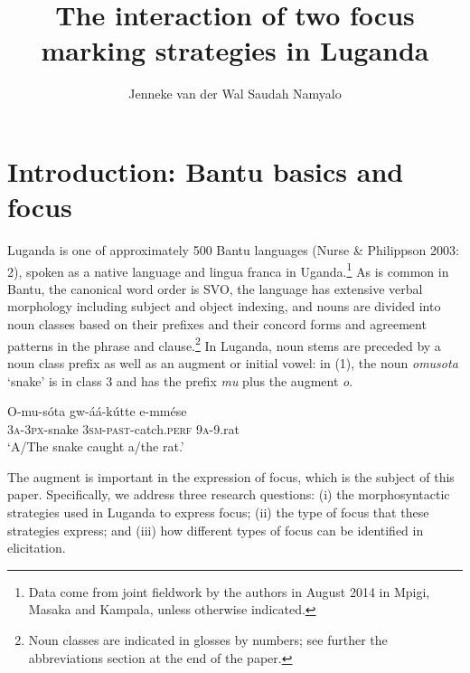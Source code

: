 \documentclass[output=paper]{langsci/langscibook}
\title{The interaction of two focus marking strategies in Luganda}
\author{%
Jenneke van der Wal \affiliation{University of Cambridge}\lastand 
 Saudah Namyalo \affiliation{Makerere University}
}
\begin{document}
 
 




\section{Introduction: Bantu basics and focus} 

Luganda is one of approximately 500 Bantu languages (Nurse \& Philippson 2003: 2), spoken as a native language and lingua franca in Uganda.\footnote{ Data come from joint fieldwork by the authors in August 2014 in Mpigi, Masaka and Kampala, unless otherwise indicated.}{ }As is common in Bantu, the canonical word order is SVO, the language has extensive verbal morphology including subject and object indexing, and nouns are divided into noun classes based on their prefixes and their concord forms and agreement patterns in the phrase and clause.\footnote{ Noun classes are indicated in glosses by numbers; see further the abbreviations section at the end of the paper.}{ }In Luganda, noun stems are preceded by a noun class prefix as well as an augment or initial vowel: in (1), the noun \textit{omusota} ‘snake’ is in class 3 and has the prefix \textit{mu} plus the augment \textit{o}. 

\ea
\gll O-mu-sóta  gw-áá-kútte      e-mmése\\
     \textsc{3a}{}-\textsc{3px}{}-snake  \textsc{3sm}{}-\textsc{past}{}-catch.\textsc{perf}  \textsc{9a}{}-9.rat\\
\glt ‘A/The snake caught a/the rat.’
\z

The augment is important in the expression of focus, which is the subject of this paper. Specifically, we address three research questions: (i) the morphosyntactic strategies used in Luganda to express focus; (ii) the type of focus that these strategies express; and (iii) how different types of focus can be identified in elicitation.
\end{document}
